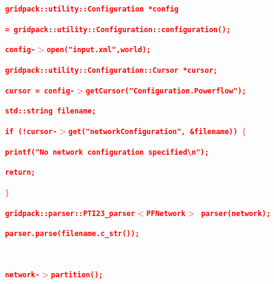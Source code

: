 \documentclass[12pt]{report} %
\begin{document}
\textcolor{red}{\texttt{\textbf{}}}

\textcolor{red}{\texttt{\textbf{  gridpack::utility::Configuration *config}}}

\textcolor{red}{\texttt{\textbf{      = gridpack::utility::Configuration::configuration();}}}

\textcolor{red}{\texttt{\textbf{  config-$\boldsymbol{\mathrm{>}}$open("input.xml",world);}}}

\textcolor{red}{\texttt{\textbf{  gridpack::utility::Configuration::Cursor *cursor;}}}

\textcolor{red}{\texttt{\textbf{  cursor = config-$\boldsymbol{\mathrm{>}}$getCursor("Configuration.Powerflow");}}}

\textcolor{red}{\texttt{\textbf{  std::string filename;}}}

\textcolor{red}{\texttt{\textbf{  if (!cursor-$\boldsymbol{\mathrm{>}}$get("networkConfiguration", \&filename)) $\boldsymbol{\mathrm{\{}}$}}}

\textcolor{red}{\texttt{\textbf{    printf("No network configuration specified{\textbackslash}n");}}}

\textcolor{red}{\texttt{\textbf{    return;}}}

\textcolor{red}{\texttt{\textbf{  $\boldsymbol{\mathrm{\}}}$}}}

\textcolor{red}{\texttt{\textbf{  gridpack::parser::PTI23\_parser$\boldsymbol{\mathrm{<}}$PFNetwork$\boldsymbol{\mathrm{>}}$ parser(network);}}}

\textcolor{red}{\texttt{\textbf{  parser.parse(filename.c\_str());}}}

\textcolor{red}{\texttt{\textbf{  }}}

\textcolor{red}{\texttt{\textbf{  network-$\boldsymbol{\mathrm{>}}$partition();}}}
\end{document}
